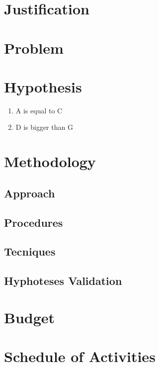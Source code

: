 \section{Justification}\label{sec:justification}



\section{Problem} \label{sec::Problem}



\section{Hypothesis} \label{sec::Hypothesis}
\begin{enumerate}
    \item A is equal to C
    \item D is bigger than G
\end{enumerate}


\section{Methodology} \label{sec:Methodology}

\subsection{Approach}

\subsection{Procedures}

\subsection{Tecniques}

\subsection{Hyphoteses Validation}


\section{Budget} \label{sec:budget}


\section{Schedule of Activities} \label{sec:schedule_activities_table}

